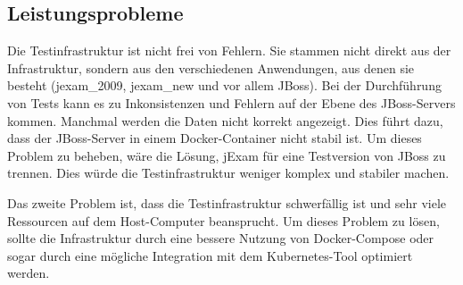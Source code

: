 \subsection{Leistungsprobleme}

Die Testinfrastruktur ist nicht frei von Fehlern. Sie stammen nicht
direkt aus der Infrastruktur, sondern aus den verschiedenen
Anwendungen, aus denen sie besteht (\gls{jexam_2009}, \gls{jexam_new} und vor
allem JBoss). Bei der Durchführung von Tests kann es zu Inkonsistenzen
und Fehlern auf der Ebene des JBoss-Servers kommen. Manchmal werden
die Daten nicht korrekt angezeigt. Dies führt dazu, dass der
JBoss-Server in einem Docker-Container nicht stabil ist. Um dieses
Problem zu beheben, wäre die Lösung, jExam für eine Testversion von
JBoss zu trennen. Dies würde die Testinfrastruktur weniger komplex
und stabiler machen.

Das zweite Problem ist, dass die Testinfrastruktur schwerfällig ist
und sehr viele Ressourcen auf dem Host-Computer beansprucht. Um dieses
Problem zu lösen, sollte die Infrastruktur durch eine bessere Nutzung
von Docker-Compose oder sogar durch eine mögliche Integration mit dem
Kubernetes-Tool optimiert werden.

